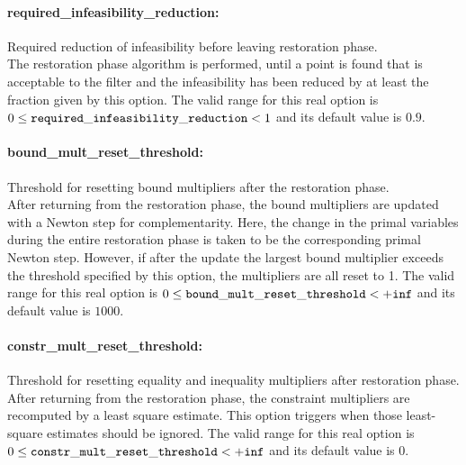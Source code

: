 \paragraph{required\_infeasibility\_reduction:}\label{sec:required_infeasibility_reduction} Required reduction of infeasibility before leaving restoration phase. $\;$ \\
 The restoration phase algorithm is performed,
until a point is found that is acceptable to the
filter and the infeasibility has been reduced by
at least the fraction given by this option. The valid range for this real option is 
$0 \le {\tt required\_infeasibility\_reduction } <  1$
and its default value is $0.9$.


\paragraph{bound\_mult\_reset\_threshold:}\label{sec:bound_mult_reset_threshold} Threshold for resetting bound multipliers after the restoration phase. $\;$ \\
 After returning from the restoration phase, the
bound multipliers are updated with a Newton step
for complementarity.  Here, the change in the
primal variables during the entire restoration
phase is taken to be the corresponding primal
Newton step. However, if after the update the
largest bound multiplier exceeds the threshold
specified by this option, the multipliers are all
reset to 1. The valid range for this real option is 
$0 \le {\tt bound\_mult\_reset\_threshold } <  {\tt +inf}$
and its default value is $1000$.


\paragraph{constr\_mult\_reset\_threshold:}\label{sec:constr_mult_reset_threshold} Threshold for resetting equality and inequality multipliers after restoration phase. $\;$ \\
 After returning from the restoration phase, the
constraint multipliers are recomputed by a least
square estimate.  This option triggers when those
least-square estimates should be ignored. The valid range for this real option is 
$0 \le {\tt constr\_mult\_reset\_threshold } <  {\tt +inf}$
and its default value is $0$.



